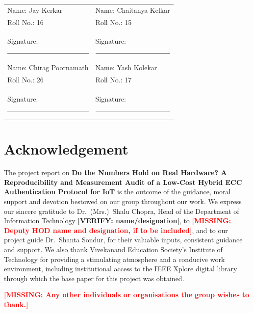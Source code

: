 \documentclass[12pt,a4paper,oneside]{report}
\numberwithin{equation}{chapter}
\newcommand{\MISSING}[1]{\textcolor{red}{\textbf{[MISSING: #1]}}}
\newcommand{\VERIFY}[1]{\textcolor{orange!85!black}{\textbf{[VERIFY: #1]}}}
\newcommand{\ProjectTitle}{Do the Numbers Hold on Real Hardware? A Reproducibility and Measurement Audit of a Low-Cost Hybrid ECC Authentication Protocol for IoT}
\newcommand{\GuideName}{Dr.\ Shanta Sondur}
\begin{document}
\vspace{0.8in}
\noindent
\begin{tabular}{p{}p{}}
Name: Jay Kerkar & Name: Chaitanya Kelkar\\[0.15in]
Roll No.: 16 & Roll No.: 15\\[0.4in]
Signature: \rule{1.5in}{0.4pt} & Signature: \rule{1.5in}{0.4pt}\\[0.5in]
Name: Chirag Poornamath & Name: Yash Kolekar\\[0.15in]
Roll No.: 26 & Roll No.: 17\\[0.4in]
Signature: \rule{1.5in}{0.4pt} & Signature: \rule{1.5in}{0.4pt}
\end{tabular}

\chapter*{Acknowledgement}
The project report on \textbf{\ProjectTitle} is the outcome of the guidance, moral support and devotion bestowed on our group throughout our work. We express our sincere gratitude to Dr.\ (Mrs.)\ Shalu Chopra, Head of the Department of Information Technology \VERIFY{name/designation}, to \MISSING{Deputy HOD name and designation, if to be included}, and to our project guide \GuideName, for their valuable inputs, consistent guidance and support. We also thank Vivekanand Education Society's Institute of Technology for providing a stimulating atmosphere and a conducive work environment, including institutional access to the IEEE Xplore digital library through which the base paper for this project was obtained.

\MISSING{Any other individuals or organisations the group wishes to thank.}
\end{document}
